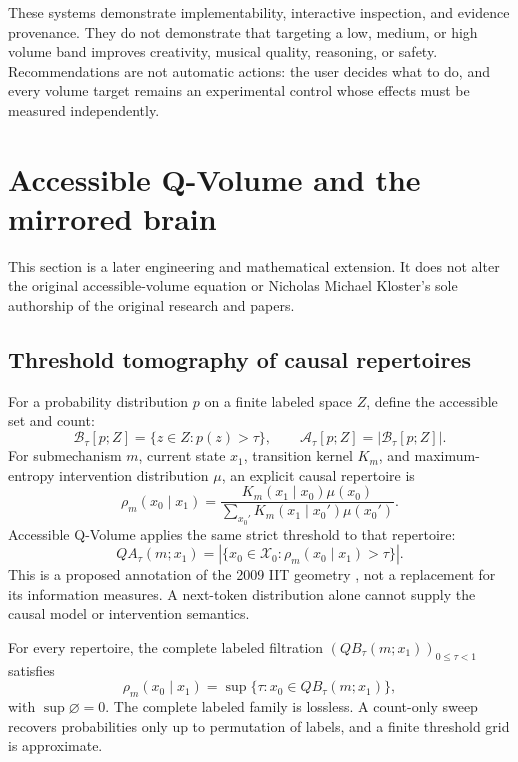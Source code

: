 \documentclass[11pt,a4paper]{article}
\begin{document}
These systems demonstrate implementability, interactive inspection, and evidence provenance. They do not demonstrate that targeting a low, medium, or high volume band improves creativity, musical quality, reasoning, or safety. Recommendations are not automatic actions: the user decides what to do, and every volume target remains an experimental control whose effects must be measured independently.

\section{Accessible Q-Volume and the mirrored brain}
This section is a later engineering and mathematical extension. It does not alter the original accessible-volume equation or Nicholas Michael Kloster's sole authorship of the original research and papers.

\subsection{Threshold tomography of causal repertoires}
For a probability distribution $p$ on a finite labeled space $Z$, define the accessible set and count:
\begin{equation}
\mathcal B_\tau[p;Z]=\{z\in Z:p(z)>\tau\},\qquad
\mathcal A_\tau[p;Z]=|\mathcal B_\tau[p;Z]|.
\end{equation}
For submechanism $m$, current state $x_1$, transition kernel $K_m$, and maximum-entropy intervention distribution $\mu$, an explicit causal repertoire is
\begin{equation}
\rho_m(x_0\mid x_1)=\frac{K_m(x_1\mid x_0)\mu(x_0)}{\sum_{x_0'}K_m(x_1\mid x_0')\mu(x_0')}.
\end{equation}
Accessible Q-Volume applies the same strict threshold to that repertoire:
\begin{equation}
QA_\tau(m;x_1)=|\{x_0\in\mathcal X_0:\rho_m(x_0\mid x_1)>\tau\}|.
\end{equation}
This is a proposed annotation of the 2009 IIT geometry \cite{iit2009}, not a replacement for its information measures. A next-token distribution alone cannot supply the causal model or intervention semantics.

For every repertoire, the complete labeled filtration $(QB_\tau(m;x_1))_{0\leq\tau<1}$ satisfies
\begin{equation}
\rho_m(x_0\mid x_1)=\sup\{\tau:x_0\in QB_\tau(m;x_1)\},
\end{equation}
with $\sup\varnothing=0$. The complete labeled family is lossless. A count-only sweep recovers probabilities only up to permutation of labels, and a finite threshold grid is approximate.
\end{document}
